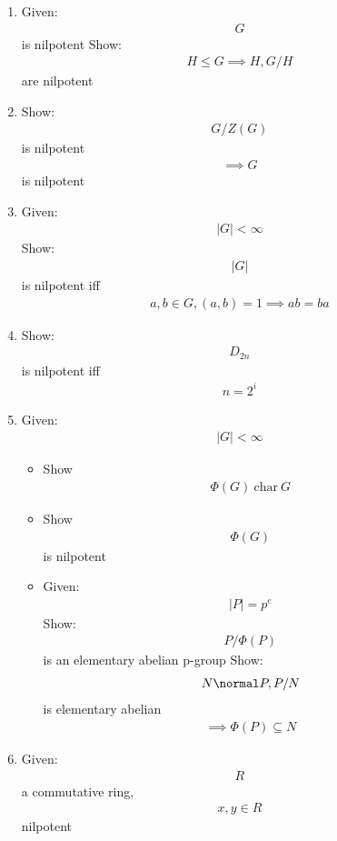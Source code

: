\begin{enumerate}
\def\labelenumi{\arabic{enumi}.}
\item
  Given: \begin{align*}G\end{align*} is nilpotent Show:
  \begin{align*}H \leq G \implies H, G/H\end{align*} are nilpotent
\item
  Show: \begin{align*}G/Z(G)\end{align*} is nilpotent
  \begin{align*}\implies G\end{align*} is nilpotent
\item
  Given: \begin{align*}|G| < \infty\end{align*} Show:
  \begin{align*}|G|\end{align*} is nilpotent iff
  \begin{align*}a,b\in G, (a,b)=1 \implies ab=ba\end{align*}
\item
  Show: \begin{align*}D_{2n}\end{align*} is nilpotent iff
  \begin{align*}n = 2^{i}\end{align*}
\item
  Given: \begin{align*}|G| < \infty\end{align*}

  \begin{itemize}
  \tightlist
  \item
    Show \begin{align*}\Phi(G)~\text{char}~ G\end{align*}
  \item
    Show \begin{align*}\Phi(G)\end{align*} is nilpotent
  \item
    Given: \begin{align*}|P| = p^e\end{align*} Show:
    \begin{align*}P / \Phi(P)\end{align*} is an elementary abelian
    p-group Show:\begin{align*}N \normal P, P/N\end{align*} is
    elementary abelian
    \begin{align*}\implies \Phi(P) \subseteq N\end{align*}
  \end{itemize}
\item
  Given: \begin{align*}R\end{align*} a commutative ring,
  \begin{align*}x,y \in R\end{align*} nilpotent


\end{enumerate}
